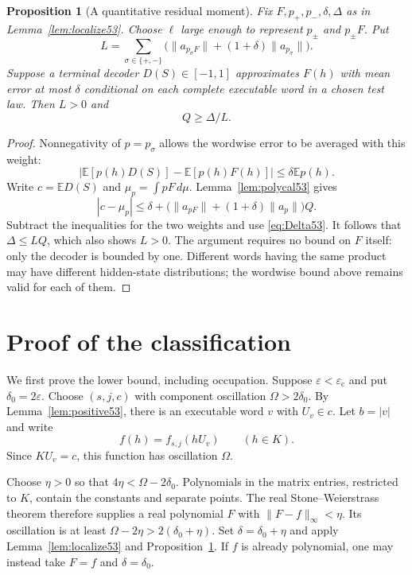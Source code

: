 \documentclass[11pt]{amsart}
\numberwithin{equation}{section}
\newtheorem{proposition}[theorem]{Proposition}
\theoremstyle{definition}
\theoremstyle{remark}
\newcommand{\E}{\mathbb E}
\newcommand{\norm}[1]{\lVert #1\rVert}
\newcommand{\epsc}{\varepsilon_{\mathrm c}}
\begin{document}
\begin{proposition}[A quantitative residual moment]\label{prop:residual53}
Fix $F,p_+,p_-,\delta,\Delta$ as in Lemma~\ref{lem:localize53}. Choose $\ell$ large enough to represent $p_\pm$ and $p_\pm F$. Put
\begin{equation}\label{eq:L53}
 L=\sum_{\sigma\in\{+,-\}}
 \bigl(\norm{a_{p_\sigma F}}+(1+\delta)\norm{a_{p_\sigma}}\bigr).
\end{equation}
Suppose a terminal decoder $D(S)\in[-1,1]$ approximates $F(h)$ with mean error at most $\delta$ conditional on each complete executable word in a chosen test law. Then $L>0$ and
\begin{equation}\label{eq:residual53}
                         Q\ge\Delta/L.
\end{equation}
\end{proposition}
\begin{proof}
Nonnegativity of $p=p_\sigma$ allows the wordwise error to be averaged with this weight:
\[
 |\E[p(h)D(S)]-\E[p(h)F(h)]|\le\delta\E p(h).
\]
Write $c=\E D(S)$ and $\mu_p=\int pF\,d\mu$. Lemma~\ref{lem:polycal53} gives
\[
 |c-\mu_p|\le\delta+
 \bigl(\norm{a_{pF}}+(1+\delta)\norm{a_p}\bigr)Q.
\]
Subtract the inequalities for the two weights and use \eqref{eq:Delta53}. It follows that $\Delta\le LQ$, which also shows $L>0$. The argument requires no bound on $F$ itself: only the decoder is bounded by one. Different words having the same product may have different hidden-state distributions; the wordwise bound above remains valid for each of them.
\end{proof}

\section{Proof of the classification}\label{sec:proof53}
We first prove the lower bound, including occupation. Suppose $\varepsilon<\epsc$ and put $\delta_0=2\varepsilon$. Choose $(s,j,c)$ with component oscillation $\Omega>2\delta_0$. By Lemma~\ref{lem:positive53}, there is an executable word $v$ with $U_v\in c$. Let $b=|v|$ and write
\[
 f(h)=f_{s,j}(hU_v)\qquad(h\in K).
\]
Since $KU_v=c$, this function has oscillation $\Omega$.

Choose $\eta>0$ so that $4\eta<\Omega-2\delta_0$. Polynomials in the matrix entries, restricted to $K$, contain the constants and separate points. The real Stone--Weierstrass theorem \cite{Rudin} therefore supplies a real polynomial $F$ with $\norm{F-f}_\infty<\eta$. Its oscillation is at least $\Omega-2\eta>2(\delta_0+\eta)$. Set $\delta=\delta_0+\eta$ and apply Lemma~\ref{lem:localize53} and Proposition~\ref{prop:residual53}. If $f$ is already polynomial, one may instead take $F=f$ and $\delta=\delta_0$.
\end{document}

